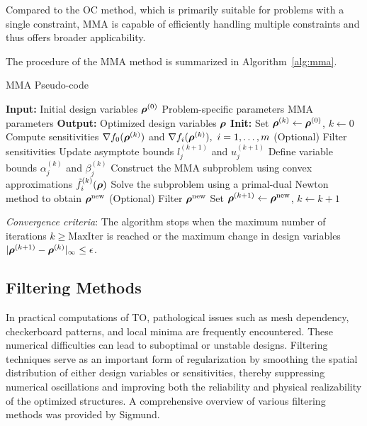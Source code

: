 \documentclass[mathpazo]{cicp}
\begin{document}
Compared to the OC method, which is primarily suitable for problems with a single constraint, MMA is capable of efficiently handling multiple constraints and thus offers broader applicability.

The procedure of the MMA method is summarized in Algorithm~\ref{alg:mma}.

\begin{FloatAlgo}{MMA Pseudo-code}\label{alg:mma}
	\begin{algorithmic}[1]
		\STATE \textbf{Input:} 
		\STATE Initial design variables $\boldsymbol{\rho}^{(0)}$
		\STATE Problem-specific parameters
		\STATE MMA parameters
		\STATE \textbf{Output:} Optimized design variables $\boldsymbol{\rho}$
		\STATE \textbf{Init:} Set $\boldsymbol{\rho}^{(k)} \leftarrow \boldsymbol{\rho}^{(0)}$, $k \leftarrow 0$
		\STATE Compute sensitivities $\nabla f_0(\boldsymbol{\rho}^{(k)})$ and $\nabla f_i(\boldsymbol{\rho}^{(k)}),~i=1,\dots,m$
		\STATE (Optional) Filter sensitivities
		\STATE Update asymptote bounds $l_j^{(k+1)}$ and $u_j^{(k+1)}$
		\STATE Define variable bounds $\alpha_j^{(k)}$ and $\beta_j^{(k)}$
		\STATE Construct the MMA subproblem using convex approximations $\tilde{f}_i^{(k)}(\boldsymbol{\rho})$
		\STATE Solve the subproblem using a primal-dual Newton method to obtain $\boldsymbol{\rho}^{\text{new}}$
		\STATE (Optional) Filter $\boldsymbol{\rho}^{\text{new}}$
		\STATE Set $\boldsymbol{\rho}^{(k+1)} \leftarrow \boldsymbol{\rho}^{\text{new}}$, $k \leftarrow k + 1$
		\ENDWHILE
	\end{algorithmic}
	\smallskip
	\textit{Convergence criteria}: The algorithm stops when the maximum number of iterations $k \geq \text{MaxIter}$ is reached or the maximum change in design variables $|\boldsymbol{\rho}^{(k+1)} - \boldsymbol{\rho}^{(k)}|_\infty \leq \epsilon$.
\end{FloatAlgo}

\subsection{Filtering Methods}
In practical computations of TO, pathological issues such as mesh dependency, checkerboard patterns, and local minima are frequently encountered\cite{bendsoe2013topology}. These numerical difficulties can lead to suboptimal or unstable designs. Filtering techniques serve as an important form of regularization by smoothing the spatial distribution of either design variables or sensitivities, thereby suppressing numerical oscillations and improving both the reliability and physical realizability of the optimized structures\cite{sigmund1998numerical}. A comprehensive overview of various filtering methods was provided by Sigmund\cite{sigmund2007morphology}. 
\end{document}
